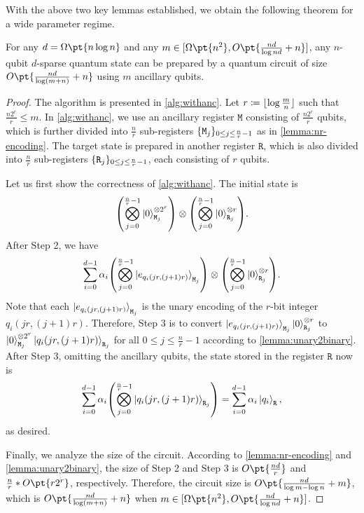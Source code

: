 \documentclass[a4paper,UKenglish,cleveref, autoref, thm-restate]{lipics-v2021}
\DeclarePairedDelimiter\rbra{\lparen}{\rparen}
\DeclarePairedDelimiter\sbra{\lbrack}{\rbrack}
\DeclarePairedDelimiter\cbra{\{}{\}}
\DeclarePairedDelimiter\floor{\lfloor}{\rfloor}
\newcommand{\bo}{O\pt}
\newcommand{\om}{\Omega\pt}
\begin{document}
With the above two key lemmas established, we obtain the following theorem for a wide parameter regime.

\begin{theorem}\label{thm:withanc}
   For any $d = \om{n\log n}$ and any $m \in \sbra{\om{n^2}, \bo{\frac{nd}{\log nd} + n}}$, any $n$-qubit $d$-sparse quantum state can be prepared by a quantum circuit of size $\bo{\frac{nd}{\log (m+n)} + n}$ using $m$ ancillary qubits.
\end{theorem}

\begin{proof}
    The algorithm is presented in \cref{alg:withanc}. Let $r \coloneqq \floor{\log \frac{m}{n}}$ such that $\frac{n2^r}{r} \leq m$. In \cref{alg:withanc}, we use an ancillary register $\texttt{M}$ consisting of $\frac{n2^r}{r}$ qubits, which is further divided into $\frac{n}{r}$ sub-registers $\cbra{\texttt{M}_j}_{0\leq j \leq \frac{n}{r}-1}$ as in \cref{lemma:nr-encoding}. The target state is prepared in another register $\texttt{R}$, which is also divided into $\frac{n}{r}$ sub-registers $\cbra{\texttt{R}_j}_{0\leq j \leq \frac{n}{r}-1}$, each consisting of $r$ qubits. 
    
    Let us first show the correctness of \cref{alg:withanc}. The initial state is 
    \begin{align}
        \rbra*{\bigotimes_{j=0}^{\frac{n}{r}-1}\ket{0}^{\otimes 2^r}_{\texttt{M}_j}} \otimes \rbra*{\bigotimes_{j=0}^{\frac{n}{r}-1}\ket{0}^{\otimes r}_{\texttt{R}_j}}.
    \end{align}
    After Step 2, we have 
    \begin{align}
        \sum_{i=0}^{d-1} \alpha_i \rbra*{\bigotimes_{j=0}^{\frac{n}{r}-1} \ket{e_{q_i(jr, (j+1)r)}}_{\texttt{M}_j}}  \otimes \rbra*{\bigotimes_{j=0}^{\frac{n}{r}-1}\ket{0}^{\otimes r}_{\texttt{R}_j}}.
    \end{align}
    Note that each $\ket{e_{q_i(jr, (j+1)r)}}_{\texttt{M}_j}$ is the unary encoding of the $r$-bit integer ${q_i(jr, (j+1)r)}$. Therefore, Step 3 is to convert $\ket{e_{q_i(jr, (j+1)r)}}_{\texttt{M}_j} \ket{0}^{\otimes r}_{\texttt{R}_j}$ to $\ket{0}^{\otimes 2^r}_{\texttt{M}_j} \ket{{q_i(jr, (j+1)r)}}_{\texttt{R}_j}$ for all $0 \leq j \leq \frac{n}{r}-1$ according to \cref{lemma:unary2binary}. 
    After Step 3, omitting the ancillary qubits, the state stored in the register $\texttt{R}$ now is 
    \begin{align}
        \sum_{i=0}^{d-1} \alpha_i \rbra*{\bigotimes_{j=0}^{\frac{n}{r}-1} \ket{q_i(jr, (j+1)r)}_{\texttt{R}_j}} = \sum_{i=0}^{d-1} \alpha_i \ket{q_i}_\texttt{R},
    \end{align}
    as desired.

    Finally, we analyze the size of the circuit. According to \cref{lemma:nr-encoding} and \cref{lemma:unary2binary}, the size of Step 2 and Step 3 is $\bo{\frac{nd}{r}}$ and $\frac{n}{r} * \bo{r2^r}$, respectively. Therefore, the circuit size is $\bo{\frac{nd}{\log m - \log n} + m}$, which is $\bo{\frac{nd}{\log (m+n)} + n}$ when  $m \in \sbra{\om{n^2}, \bo{\frac{nd}{\log nd} + n}}$.
\end{proof}
\end{document}
